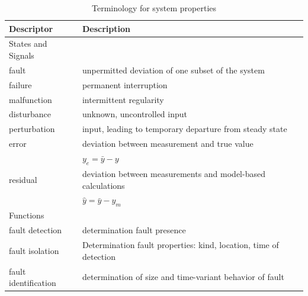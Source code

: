 \begin{table}
    \centering
    \caption{Terminology for system properties  \cite{isermann_fault-diagnosis_2011}}
    \begin{tabular}{@{}ll@{}}
        \toprule
        Descriptor            & Description                                                                               \\ \midrule
        States and Signals    &                                                                                           \\ \midrule
        fault                 & unpermitted deviation of one subset of the system                                         \\
        failure               & permanent interruption                                                                    \\
        malfunction           & intermittent regularity                                                                   \\
        disturbance           & unknown, uncontrolled input                                                               \\
        perturbation          & input, leading to temporary departure from steady state                                   \\
        error                 & deviation between measurement and true value                                              \\              & $y_e = \bar{y} -y$                               \\
        residual             & deviation between measurements and model-based calculations                                                                                           \\       & $\hat{y} = \bar{y} -y_m$                                                              \\ \bottomrule
        Functions       &                         \\ \midrule
        fault detection  & determination fault presence                                  \\
        fault isolation       & Determination fault properties: kind, location, time of detection                                       \\
        fault identification            & determination of size and time-variant behavior of fault                               \\

\end{tabular}
\end{table}
